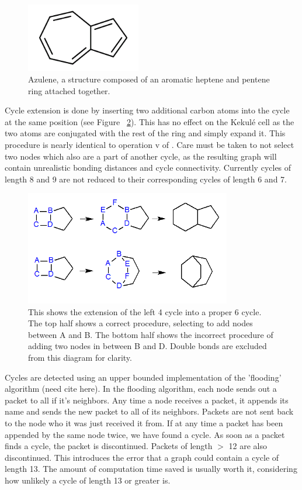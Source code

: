 \documentclass[12pt]{article}
\begin{document}
\begin{figure}[ht!]
\centering
\includegraphics[width=50mm]{azulene.png}
\caption{Azulene, a structure composed of an aromatic heptene and pentene ring attached together.}
\label{fig:azulene}
\end{figure}

Cycle extension is done by inserting two additional carbon atoms into the cycle at the same position (see Figure ~\ref{fig:cycleExtension}). This has no effect on the Kekul\'e cell as the two atoms are conjugated with the rest of the ring and simply expand it. This procedure is nearly identical to operation v of \cite{v06}. Care must be taken to not select two nodes which also are a part of another cycle, as the resulting graph will contain unrealistic bonding distances and cycle connectivity. Currently cycles of length 8 and 9 are not reduced to their corresponding cycles of length 6 and 7. 

\begin{figure}[ht!]
\centering
\includegraphics[width=90mm]{cycleExtension.png}
\caption{This shows the extension of the left 4 cycle into a proper 6 cycle. The top half shows a correct procedure, selecting to add nodes between A and B. The bottom half shows the incorrect procedure of adding two nodes in between B and D. Double bonds are excluded from this diagram for clarity.}
\label{fig:cycleExtension}
\end{figure}

Cycles are detected using an upper bounded implementation of the 'flooding' algorithm (need cite here). In the flooding algorithm, each node sends out a packet to all if it's neighbors. Any time a node receives a packet, it appends its name and sends the new packet to all of its neighbors. Packets are not sent back to the node who it was just received it from. If at any time a packet has been appended by the same node twice, we have found a cycle. As soon as a packet finds a cycle, the packet is discontinued. Packets of length $>$ 12 are also discontinued. This introduces the error that a graph could contain a cycle of length 13. The amount of computation time saved is usually worth it, considering how unlikely a cycle of length 13 or greater is. 
\end{document}
